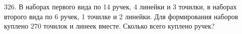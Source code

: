 326. В наборах первого вида по 14 ручек, 4 линейки и 3 точилки, в наборах второго вида по 6 ручек, 1 точилке и 2 линейки. Для формирования наборов куплено
270 точилок и линеек вместе. Сколько всего куплено ручек?\\

